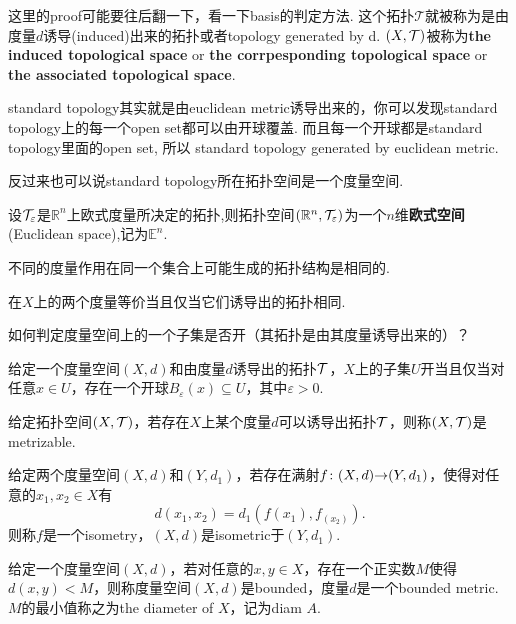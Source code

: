 这里的proof可能要往后翻一下，看一下basis的判定方法. 这个拓扑$\mathcal{T}$就被称为是由度量$d$诱导(induced)出来的拓扑或者topology generated by d. $(X,\mathcal{T})$被称为\textbf{the induced topological space} or \textbf{the corrpesponding topological space} or \textbf{the associated topological space}.


standard topology其实就是由euclidean metric诱导出来的，你可以发现standard topology上的每一个open set都可以由开球覆盖. 而且每一个开球都是standard topology里面的open set, 所以 standard topology generated by euclidean metric. 

反过来也可以说standard topology所在拓扑空间是一个度量空间.
\begin{definition}
设$\mathcal{T}_\varepsilon$是$\mathbb{R}^n$上欧式度量所决定的拓扑,则拓扑空间$(\mathbb{R}^n,\mathcal{T}_\varepsilon)$为一个$n$维\textbf{欧式空间}(Euclidean space),记为$\mathbb{E}^n$.
\end{definition}


不同的度量作用在同一个集合上可能生成的拓扑结构是相同的.

\begin{definition}
在$X$上的两个度量等价当且仅当它们诱导出的拓扑相同.
\end{definition}


如何判定度量空间上的一个子集是否开（其拓扑是由其度量诱导出来的）？

\begin{proposition}
给定一个度量空间$(X,d)$和由度量$d$诱导出的拓扑$\mathcal{T}$，$X$上的子集$U$开当且仅当对任意$x \in U$，存在一个开球$B_\varepsilon(x) \subseteq U$，其中$\varepsilon>0$.
\end{proposition}

\begin{definition}[metrizable]
给定拓扑空间$(X,\mathcal{T})$，若存在$X$上某个度量$d$可以诱导出拓扑$\mathcal{T}$，则称$(X,\mathcal{T})$是metrizable.
\end{definition}

\begin{definition}[isometry]
给定两个度量空间$(X,d)$和$(Y,d_1)$，若存在满射${f}\colon{(X,d)}{\to}{(Y,d_1)}$，使得对任意的$x_1,x_2 \in X$有\[d(x_1,x_2)=d_1(f(x_1),f_(x_2)).\]则称$f$是一个isometry，$(X,d)$是isometric于$(Y,d_1)$.
\end{definition}

\begin{definition}[Bounded]
给定一个度量空间$(X,d)$，若对任意的$x,y \in X$，存在一个正实数$M$使得$d(x,y) < M$，则称度量空间$(X,d)$是bounded，度量$d$是一个bounded metric.$M$的最小值称之为the diameter of $X$，记为diam $A$.
\end{definition}

